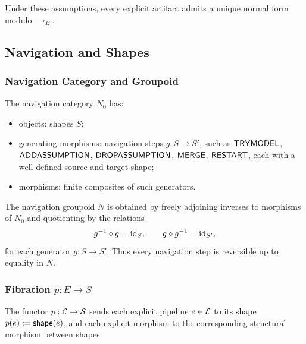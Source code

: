 Under these assumptions, every explicit artifact admits a unique normal
form modulo \(\to_E\).

\subsection{Navigation and Shapes}

\subsubsection{Navigation Category and Groupoid}

\begin{definition}
The navigation category \(N_0\) has:
\begin{itemize}
  \item objects: shapes \(S\);
  \item generating morphisms: navigation steps
        \(g : S \to S'\), such as \(\mathsf{TRYMODEL}\),
        \(\mathsf{ADDASSUMPTION}\), \(\mathsf{DROPASSUMPTION}\),
        \(\mathsf{MERGE}\), \(\mathsf{RESTART}\), each with a well-defined
        source and target shape;
  \item morphisms: finite composites of such generators.
\end{itemize}
\end{definition}

\begin{definition}
The navigation groupoid \(N\) is obtained by freely adjoining inverses
to morphisms of \(N_0\) and quotienting by the relations
\[
g^{-1} \circ g = \mathrm{id}_S, \qquad
g \circ g^{-1} = \mathrm{id}_{S'},
\]
for each generator \(g : S \to S'\).
Thus every navigation step is reversible up to equality in \(N\).
\end{definition}

\subsubsection{Fibration \(p : E \to S\)}

\begin{definition}
The functor \(p : \mathcal{E} \to \mathcal{S}\) sends each explicit pipeline
\(e \in \mathcal{E}\) to its shape
\(p(e) := \mathsf{shape}(e)\), and each explicit morphism to the corresponding
structural morphism between shapes.
\end{definition}

